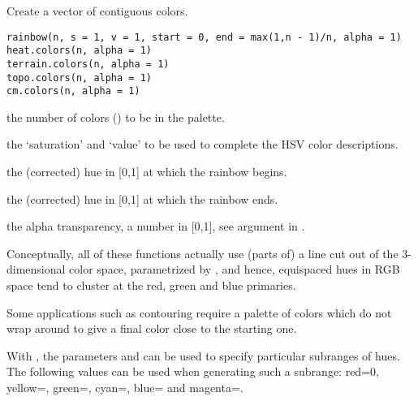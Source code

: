 %
\begin{Description}\relax
Create a vector of  contiguous colors.
\end{Description}
%
\begin{Usage}
\begin{verbatim}
rainbow(n, s = 1, v = 1, start = 0, end = max(1,n - 1)/n, alpha = 1)
heat.colors(n, alpha = 1)
terrain.colors(n, alpha = 1)
topo.colors(n, alpha = 1)
cm.colors(n, alpha = 1)
\end{verbatim}
\end{Usage}
%
\begin{Arguments}
\begin{ldescription}
\item[\code{n}] the number of colors () to be in the
palette.
\item[\code{s,v}] the `saturation' and `value' to be used
to complete the HSV color descriptions.
\item[\code{start}] the (corrected) hue in [0,1] at which the rainbow
begins.
\item[\code{end}] the (corrected) hue in [0,1] at which the rainbow ends.
\item[\code{alpha}] the alpha transparency, a number in [0,1], see argument
 in .
\end{ldescription}
\end{Arguments}
%
\begin{Details}\relax
Conceptually, all of these functions actually use (parts of) a line
cut out of the 3-dimensional color space, parametrized by
, and hence,
equispaced hues in RGB space tend to cluster at
the red, green and blue primaries.

Some applications such as contouring require a palette
of colors which do not wrap around to give a final
color close to the starting one.

With , the parameters  and  can be used
to specify particular subranges of hues.
The following values can be used when generating such a subrange:
red=0, yellow=, green=,
cyan=, blue=
and magenta=.
\end{Details}
